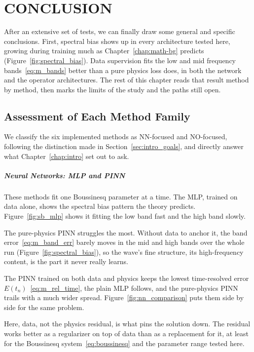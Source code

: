 \chapter{CONCLUSION}
\label{chap:conclusions}

After an extensive set of tests, we can finally draw some general and specific conclusions. First, spectral bias shows up in every architecture tested here, growing during training much as Chapter~\ref{chap:math-bg} predicts (Figure~\ref{fig:spectral_bias}). Data supervision fits the low and mid frequency bands~\eqref{eq:m_bands} better than a pure physics loss does, in both the network and the operator architectures. The rest of this chapter reads that result method by method, then marks the limits of the study and the paths still open.

\section{Assessment of Each Method Family}
\label{sec:c_verdict}

We classify the six implemented methods as NN-focused and NO-focused, following the distinction made in Section~\ref{sec:intro_goals}, and directly answer what Chapter~\ref{chap:intro} set out to ask.

\paragraph{Neural Networks: MLP and PINN} These methods fit one Boussinesq parameter at a time. The MLP, trained on data alone, shows the spectral bias pattern the theory predicts. Figure~\ref{fig:sb_mlp} shows it fitting the low band fast and the high band slowly. 

The pure-physics PINN struggles the most. Without data to anchor it, the band error~\eqref{eq:m_band_err} barely moves in the mid and high bands over the whole run (Figure~\ref{fig:spectral_bias}), so the wave's fine structure, its high-frequency content, is the part it never really learns. 

The PINN trained on both data and physics keeps the lowest time-resolved error $E(t_n)$~\eqref{eq:m_rel_time}, the plain MLP follows, and the pure-physics PINN trails with a much wider spread. Figure~\ref{fig:nn_comparison} puts them side by side for the same problem.

Here, data, not the physics residual, is what pins the solution down. The residual works better as a regularizer on top of data than as a replacement for it, at least for the Boussinesq system~\eqref{eq:boussinesq} and the parameter range tested here.

